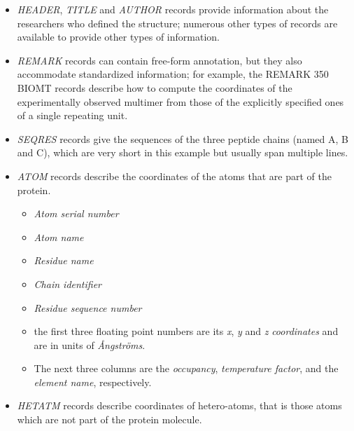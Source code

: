 \documentclass[11pt]{article}
\begin{document}
\begin{itemize}
\item \emph{HEADER}, \emph{TITLE} and \emph{AUTHOR} records provide information about the researchers who
defined the structure; numerous other types of records are available to
provide other types of information.
\item \emph{REMARK} records can contain free-form annotation, but they also accommodate
standardized information; for example, the REMARK 350 BIOMT records describe
how to compute the coordinates of the experimentally observed multimer from
those of the explicitly specified ones of a single repeating unit.
\item \emph{SEQRES} records give the sequences of the three peptide chains (named A, B
and C), which are very short in this example but usually span multiple lines.
\item \emph{ATOM} records describe the coordinates of the atoms that are part of the
protein. 
\begin{itemize}
\item \emph{Atom serial number}
\item \emph{Atom name}
\item \emph{Residue name}
\item \emph{Chain identifier}
\item \emph{Residue sequence number}
\end{itemize}
\begin{itemize}
\item the first three floating point numbers are its \emph{x}, \emph{y} and \emph{z}
\emph{coordinates} and are in units of \emph{Ångströms}.
\item The next three columns are the \emph{occupancy}, \emph{temperature factor}, and the
\emph{element name}, respectively.
\end{itemize}
\item \emph{HETATM} records describe coordinates of hetero-atoms, that is those atoms which
are not part of the protein molecule.
\end{itemize}
\end{document}
